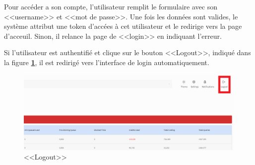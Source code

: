 \begin{itemize}
                \par Pour accéder a son compte, l'utilisateur remplit le formulaire avec son <<username>> et <<mot de passe>>. Une fois les données sont valides, le système attribut une token d'accées à cet utilisateur et le redirige vers la page d'acceuil. Sinon, il relance la page de <<login>> en indiquant l'erreur.
                \par Si l'utilisateur est authentifié et clique sur le bouton <<Logout>>, indiqué dans la figure \textbf{\ref{fig:logout}}, il est redirigé vers l'interface de login automatiquement.
                \begin{figure}[H]
                    \centering
                    \includegraphics[width =0.8\linewidth]{img/captures/auth/logout.png}
                    \caption{ <<Logout>>}
                        \label{fig:logout}
                    \end{figure}
            \end{itemize}
